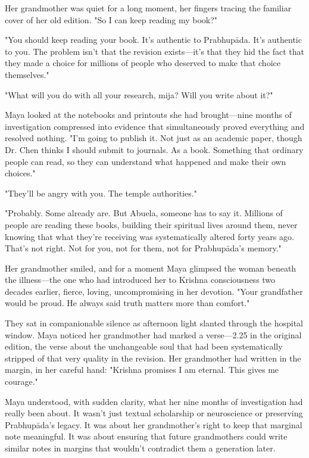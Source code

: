\documentclass[12pt,twoside]{book}
\begin{document}
Her grandmother was quiet for a long moment, her fingers tracing the familiar cover of her old edition. "So I can keep reading my book?"

"You should keep reading your book. It's authentic to Prabhupāda. It's authentic to you. The problem isn't that the revision exists—it's that they hid the fact that they made a choice for millions of people who deserved to make that choice themselves."

"What will you do with all your research, mija? Will you write about it?"

Maya looked at the notebooks and printouts she had brought—nine months of investigation compressed into evidence that simultaneously proved everything and resolved nothing. "I'm going to publish it. Not just as an academic paper, though Dr. Chen thinks I should submit to journals. As a book. Something that ordinary people can read, so they can understand what happened and make their own choices."

"They'll be angry with you. The temple authorities."

"Probably. Some already are. But Abuela, someone has to say it. Millions of people are reading these books, building their spiritual lives around them, never knowing that what they're receiving was systematically altered forty years ago. That's not right. Not for you, not for them, not for Prabhupāda's memory."

Her grandmother smiled, and for a moment Maya glimpsed the woman beneath the illness—the one who had introduced her to Krishna consciousness two decades earlier, fierce, loving, uncompromising in her devotion. "Your grandfather would be proud. He always said truth matters more than comfort."

They sat in companionable silence as afternoon light slanted through the hospital window. Maya noticed her grandmother had marked a verse—2.25 in the original edition, the verse about the unchangeable soul that had been systematically stripped of that very quality in the revision. Her grandmother had written in the margin, in her careful hand: "Krishna promises I am eternal. This gives me courage."

Maya understood, with sudden clarity, what her nine months of investigation had really been about. It wasn't just textual scholarship or neuroscience or preserving Prabhupāda's legacy. It was about her grandmother's right to keep that marginal note meaningful. It was about ensuring that future grandmothers could write similar notes in margins that wouldn't contradict them a generation later.
\end{document}
